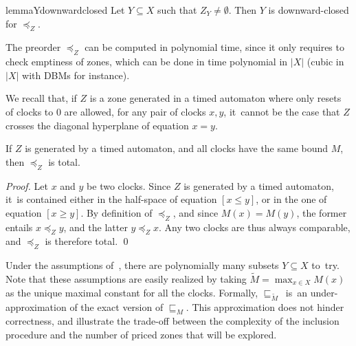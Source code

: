 \begin{restatable}{lemma}{Ydownwardclosed}
  Let $Y \subseteq X$ such that $Z_Y \ne \emptyset$. Then $Y$ is
  downward-closed for $\preceq_Z$.
\end{restatable}

The preorder $\preceq_Z$ can be computed in polynomial time, since it
only requires to check emptiness of zones, which can be done in time
polynomial in $|X|$ (cubic in $|X|$ with DBMs for instance).

We recall that, if $Z$ is a zone generated in a timed automaton where
only resets of clocks to $0$ are allowed, for any pair of clocks
$x,y$, it~cannot be the case that $Z$ crosses the diagonal hyperplane of
equation $x = y$. 

\begin{proposition}
  \label{prop:total_samebound}
  If $Z$ is generated by a timed automaton, and all clocks have the
  same bound $M$, then $\preceq_Z$ is total.
\end{proposition}

\begin{proof}
  Let $x$ and $y$ be two clocks. Since $Z$ is generated by a timed automaton,
  it~is contained either in the half-space of equation $[x \leq y]$, or in the
  one of equation $[x \geq y]$. By definition of $\preceq_Z$, and since $M(x)
  = M(y)$, the former entails $x \preceq_Z y$, and the latter $y \preceq_Z x$.
  Any two clocks are thus always comparable, and $\preceq_Z$ is therefore
  total. \qed
\end{proof}

Under the assumptions of~, there are
polynomially many subsets $Y\subseteq X$ to~try.
  Note that these assumptions are easily realized by taking
  $\widetilde{M} = \max_{x \in X} M(x)$ as the unique maximal constant for
  all the clocks.
  Formally, $\sqsubseteq_{\widetilde{M}}$~is~an under-approximation of
  the exact version of $\sqsubseteq_M$.  This approximation does not
  hinder correctness, and illustrate the trade-off between the
  complexity of the inclusion procedure and the number of priced zones
  that will be explored.
